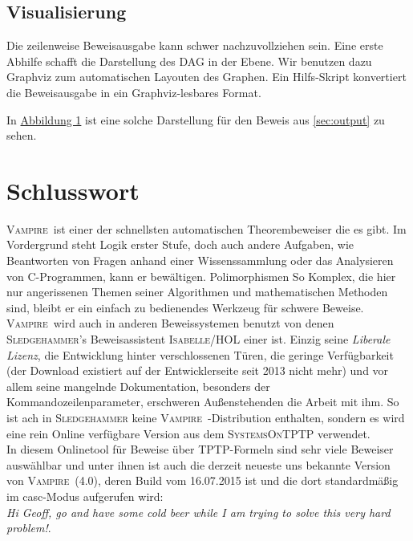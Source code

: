 \documentclass{article}
\newcommand{\vampire}{\textsc{Vampire}~}
\begin{document}
\subsection{Visualisierung}
\label{subsec:outputvis}

Die zeilenweise Beweisausgabe kann schwer nachzuvollziehen sein. Eine erste Abhilfe schafft
die Darstellung des DAG in der Ebene. Wir benutzen dazu Graphviz zum automatischen Layouten
des Graphen. Ein Hilfs-Skript konvertiert die Beweisausgabe in ein Graphviz-lesbares Format.

In \hyperref[fig:pytripleproof]{Abbildung 1} ist eine solche Darstellung für den Beweis aus \ref{sec:output} 
zu sehen.





\section{Schlusswort}
\label{sec:conclusion}
\vampire ist einer der schnellsten automatischen Theorembeweiser die es gibt. Im Vordergrund steht Logik erster Stufe, doch auch andere Aufgaben, wie Beantworten von Fragen anhand einer Wissenssammlung oder das Analysieren von C-Programmen, kann er bewältigen. Polimorphismen  So Komplex, die hier nur angerissenen Themen seiner Algorithmen und mathematischen Methoden sind, bleibt er ein einfach zu bedienendes Werkzeug für schwere Beweise. 
\vampire wird auch in anderen Beweissystemen benutzt von denen \textsc{Sledgehammer}'s Beweisassistent \textsc{Isabelle/HOL} einer ist.
Einzig seine \textit{Liberale Lizenz}, die Entwicklung hinter verschlossenen Türen, die geringe Verfügbarkeit (der Download existiert auf der Entwicklerseite seit 2013 nicht mehr) und vor allem seine mangelnde Dokumentation, besonders der Kommandozeilenparameter, erschweren Außenstehenden die Arbeit mit ihm.
So ist ach in \textsc{Sledgehammer} keine \vampire-Distribution enthalten, sondern es wird eine rein Online verfügbare Version aus dem \textsc{SystemsOnTPTP} \cite{systemOnTPTP} verwendet. \cite[S. 1-3]{blanchettemy} \\In diesem Onlinetool für Beweise über TPTP-Formeln sind sehr viele Beweiser auswählbar und unter ihnen ist auch die derzeit neueste uns bekannte Version von \vampire (4.0), deren Build vom 16.07.2015 ist und die dort standardmäßig im casc-Modus aufgerufen wird:  \\ \textit{Hi Geoff, go and have some cold beer while I am trying to solve this very hard problem!}.
\end{document}
